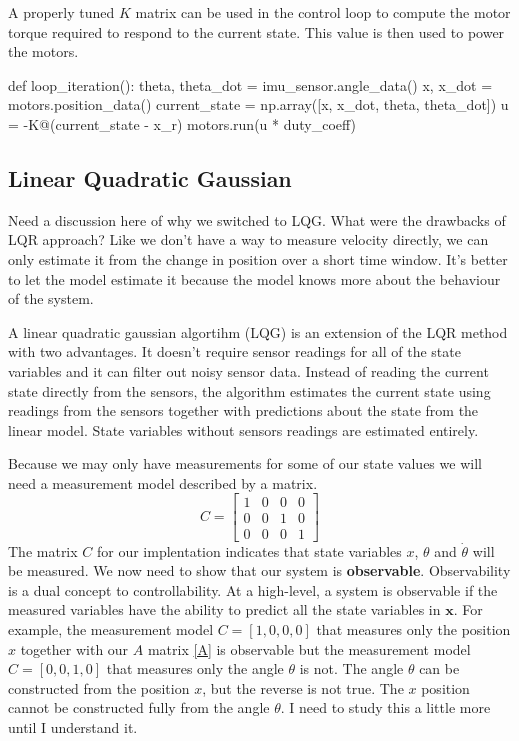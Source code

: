 \documentclass[]{article}
\newcommand{\bx}{\boldsymbol{x}}
\begin{document}
A properly tuned $K$ matrix can be used in the control loop to compute the motor torque required to respond to the current state.  This value is then used to power the motors.
\vspace{\baselineskip}
\begin{python}
	def loop_iteration():
		theta, theta_dot = imu_sensor.angle_data()
		x, x_dot = motors.position_data()
		current_state = np.array([x, x_dot, theta, theta_dot])
		u = -K@(current_state - x_r)
		motors.run(u * duty_coeff)
\end{python}

\subsection*{Linear Quadratic Gaussian}
Need a discussion here of why we switched to LQG. What were the drawbacks of LQR approach? Like we don't have a way to measure velocity directly, we can only estimate it from the change in position over a short time window.  It's better to let the model estimate it because the model knows more about the behaviour of the system.

A linear quadratic gaussian algortihm (LQG) is an extension of the LQR method with two advantages.  It doesn't require sensor readings for all of the state variables and it can filter out noisy sensor data. Instead of reading the current state directly from the sensors, the algorithm estimates the current state using readings from the sensors together with predictions about the state from the linear model. State variables without sensors readings are estimated entirely. 

Because we may only have measurements for some of our state values we will need a measurement model described by a matrix.
\begin{equation}
	C = 
	\begin{bmatrix}
		1 & 0 & 0 & 0 \\
		0 & 0 & 1 & 0 \\
		0 & 0 & 0 & 1
	\end{bmatrix} \label{C}
\end{equation}	
The matrix $C$ for our implentation indicates that state variables $x$, $\theta$ and $\dot{\theta}$ will be measured.  We now need to show that our system is {\bf observable}. Observability is a dual concept to controllability. At a high-level, a system is observable if the measured variables have the ability to predict all the state variables in $\bx$.  For example, the measurement model $C = [1, 0, 0, 0]$ that measures only the position $x$ together with our $A$ matrix \eqref{A} is observable but the measurement model $C = [0, 0, 1, 0]$ that measures only the angle $\theta$ is not.  The angle $\theta$ can be constructed from the position $x$, but the reverse is not true. The $x$ position cannot be constructed fully from the angle $\theta$.  I need to study this a little more until I understand it.
\end{document}

